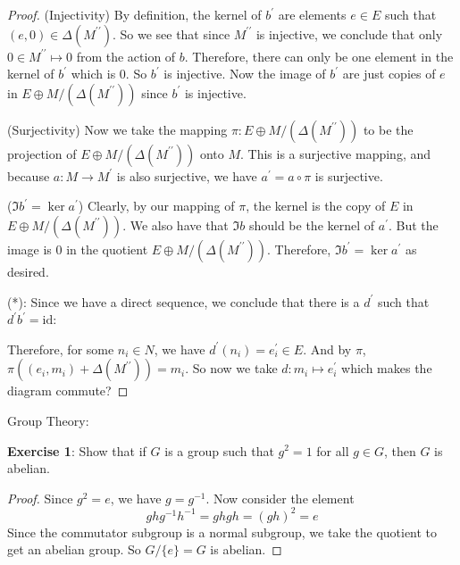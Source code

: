 \documentclass{article}
\begin{document}
\begin{proof}
        (Injectivity) By definition, the kernel of $b^{\prime}$ are elements $e \in E$ such that $(e, 0) \in \Delta(M^{\prime\prime})$. So we see that since $M^{\prime\prime}$ is injective, we conclude that only $0 \in M^{\prime\prime} \mapsto 0$ from the action of $b$. Therefore, there can only be one element in the kernel of $b^{\prime}$ which is $0$. So $b^{\prime}$ is injective. Now the image of $b^{\prime}$ are just copies of $e$ in $E \oplus M/(\Delta(M^{\prime\prime}))$ since $b^{\prime}$ is injective. 

        (Surjectivity) Now we take the mapping $\pi: E \oplus M/(\Delta(M^{\prime\prime}))$ to be the projection of $E \oplus M/(\Delta(M^{\prime\prime}))$ onto $M$. This is a surjective mapping, and because $a: M \rightarrow M^{\prime}$ is also surjective, we have $a^{\prime} = a \circ \pi$ is surjective.

        ($\Im{b^{\prime}} = \ker{a^{\prime}}$) Clearly, by our mapping of $\pi$, the kernel is the copy of $E$ in $E \oplus M/(\Delta(M^{\prime\prime}))$. We also have that $\Im{b}$ should be the kernel of $a^{\prime}$. But the image is 0 in the quotient $E \oplus M/(\Delta(M^{\prime\prime}))$. Therefore, $\Im{b^{\prime}} = \ker{a^{\prime}}$ as desired.

        (*): Since we have a direct sequence, we conclude that there is a $d^{\prime}$ such that $d^{\prime}b^{\prime} = \text{id}$:
            \begin{center}
            \end{center}
        Therefore, for some $n_{i} \in N$, we have $d^{\prime}(n_{i}) = e_{i}^{\prime} \in E$. And by $\pi$, $\pi((e_{i}, m_{i}) + \Delta(M^{\prime\prime})) = m_{i}$. So now we take $d: m_{i} \mapsto e^{\prime}_{i}$ which makes the diagram commute?
    \end{proof}

Group Theory:

\textbf{Exercise 1}: Show that if $G$ is a group such that $g^{2} = 1$ for all $g \in G$, then $G$ is abelian.
    \begin{proof}
        Since $g^{2} = e$, we have $g = g^{-1}$. Now consider the element 
            \begin{equation*}
                ghg^{-1}h^{-1} = ghgh = (gh)^{2} = e
            \end{equation*}
        Since the commutator subgroup is a normal subgroup, we take the quotient to get an abelian group. So $G/\{e\} = G$ is abelian.
    \end{proof}
\end{document}
